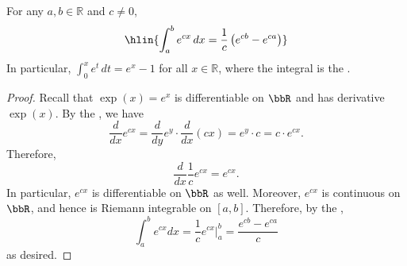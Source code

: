 \begin{proposition} \label{proposition:integral_of_exponential_function}
For any $a, b \in \mathbb{R}$ and $c \neq 0$,
$$\hlin{\int_a^b e^{cx} \, dx = \frac{1}{c}\left(e^{cb} - e^{ca}\right)}$$
In particular, $\int_0^x e^t \, dt = e^x - 1$ for all $x \in \mathbb{R}$, where the integral is the .
\end{proposition}
\begin{proof}
    Recall that $\exp(x) = e^x$ is differentiable on $\bbR$ and has derivative $\exp(x)$. By the , we have 
    $$\frac{d}{dx} e^{cx} = \frac{d}{dy} e^{y} \cdot \frac{d}{dx} (cx) = e^y \cdot c = c \cdot e^{cx}.$$
    Therefore, 
    $$\frac{d}{dx} \frac{1}{c} e^{cx} = e^{cx}.$$
    In particular, $e^{cx}$ is differentiable on $\bbR$ as well. Moreover, $e^{cx}$ is continuous on $\bbR$, and hence is Riemann integrable on $[a,b]$. Therefore, by the , 
    $$\int_a^b e^{cx} dx = \frac{1}{c} e^{cx} \biggr \vert_a^b = \frac{e^{cb} - e^{ca}}{c}$$
    as desired. 
\end{proof}